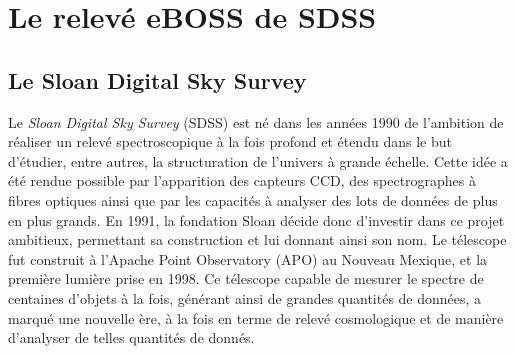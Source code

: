% 

% 


\chapter{Le relevé eBOSS de SDSS}
\minitoc
\newpage
\thispagestyle{fancy}
\graphicspath{ {../figures/eBOSS/} }

\section{Le Sloan Digital Sky Survey}
\label{sec:sdss}

Le \emph{Sloan Digital Sky Survey} (SDSS) est né dans les années 1990 de l'ambition de réaliser un relevé spectroscopique à la fois profond et étendu dans le but d'étudier, entre autres, la structuration de l'univers à grande échelle. Cette idée a été rendue possible par l'apparition des capteurs CCD, des spectrographes à fibres optiques ainsi que par les capacités à analyser des lots de données de plus en plus grands. En 1991, la fondation Sloan décide donc d'investir dans ce projet ambitieux, permettant sa construction et lui donnant ainsi son nom. 
Le télescope fut construit à l'Apache Point Observatory (APO) au Nouveau Mexique, et la première lumière prise en 1998. Ce télescope capable de mesurer le spectre de centaines d'objets à la fois, générant ainsi de grandes quantités de données, a marqué une nouvelle ère, à la fois en terme de relevé cosmologique et de manière d'analyser de telles quantités de donnés.


